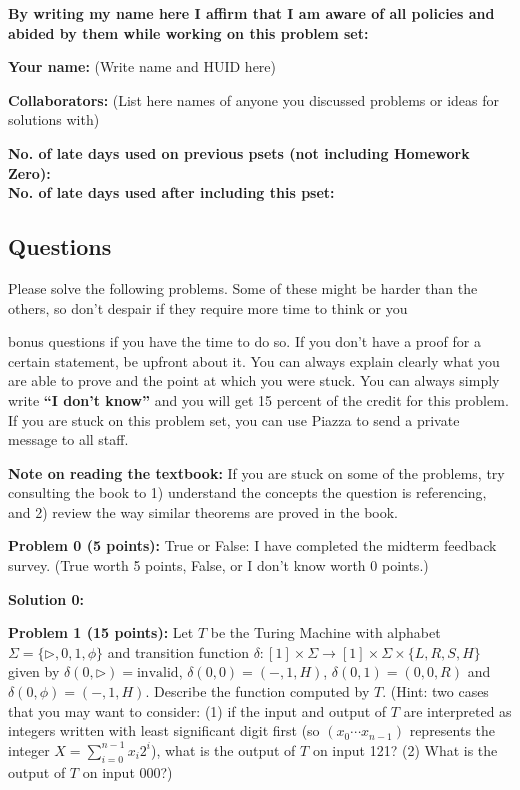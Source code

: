 \documentclass[11pt]{article}
\begin{document}
	\textbf{By writing my name here I affirm that I am aware of all policies
		and abided by them while working on this problem set:}
	
	\textbf{Your name:} (Write name and HUID here)
	
	\textbf{Collaborators:} (List here names of anyone you discussed
	problems or ideas for solutions with)
	
	\textbf{No. of late days used on previous psets (not including Homework Zero): }\\
	\textbf{No. of late days used after including this pset: }
	
	
	\newpage
	
	\subsection*{Questions}\label{questions}


Please solve the following problems. Some of these might be harder than
the others, so don't despair if they require more time to think or you
 
bonus questions if you have the time to do so. If you don't have a proof
for a certain statement, be upfront about it. You can always explain
clearly what you are able to prove and the point at which you were
stuck. %
You can always simply write
\textbf{``I don't know''} and you will get 15 percent of the credit for
this problem. If you are stuck on this problem set, you can use Piazza to
send a private message to all staff.


\textbf{Note on reading the textbook:} If you are stuck on some of the
problems, try consulting the book to 1) understand the concepts the
question is referencing, and 2) review the way similar theorems are
proved in the book.

\textbf{Problem 0 (5 points):} True or False: I have completed the midterm feedback survey. (True worth 5 points, False, or I don't know worth 0 points.)

\textbf{Solution 0:} 

\textbf{Problem 1 (15 points):} Let $T$ be the Turing Machine with alphabet $\Sigma = \{\triangleright, 0,1,\phi\}$ and transition function $\delta:[1] \times \Sigma \to [1] \times \Sigma \times \{L,R,S,H\}$ given by 
$\delta(0,\triangleright) = \mathrm{invalid}$, $\delta(0,0) = (-,1,H)$, $\delta(0,1) = (0,0,R)$ and $\delta(0,\phi)=(-,1,H)$. 
Describe the function computed by $T$. (Hint: two cases that you may want to consider: (1) if the input and output of $T$ are interpreted as integers written with least significant digit first (so $(x_0\cdots x_{n-1})$ represents the integer $X = \sum_{i=0}^{n-1} x_i 2^i$), what is the output of $T$ on input 121? (2) What is the output of $T$ on input 000?)
\end{document}
